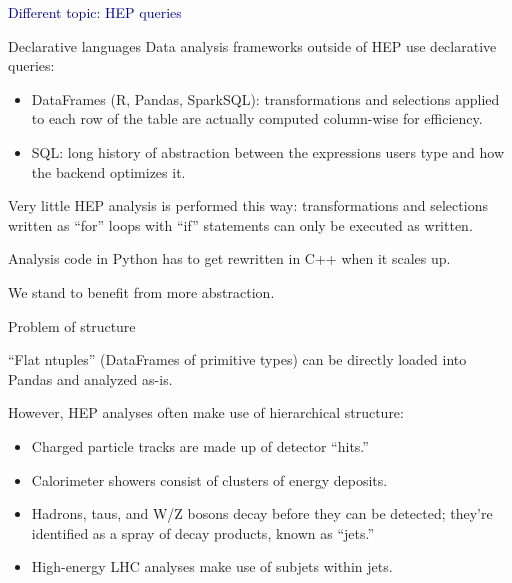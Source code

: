 \documentclass{beamer}
\begin{document}
\begin{frame}{}
\begin{center}
\Huge \textcolor{darkblue}{Different topic: HEP queries}
\end{center}
\end{frame}

\begin{frame}{Declarative languages}
\vspace{0.25 cm}
Data analysis frameworks outside of HEP use declarative queries:
\begin{itemize}
\item DataFrames (R, Pandas, SparkSQL): transformations and selections applied to each row of the table are actually computed column-wise for efficiency.
\item SQL: long history of abstraction between the expressions users type and how the backend optimizes it.
\end{itemize}

\vspace{0.5 cm}
Very little HEP analysis is performed this way: transformations and selections written as ``for'' loops with ``if'' statements can only be executed as written.

\vspace{0.25 cm}
Analysis code in Python has to get rewritten in C++ when it scales up.

\vspace{0.25 cm}
We stand to benefit from more abstraction.
\end{frame}

\begin{frame}{Problem of structure}

``Flat ntuples'' (DataFrames of primitive types) can be directly loaded into Pandas and analyzed as-is.

\vspace{0.5 cm}
However, HEP analyses often make use of hierarchical structure:
\begin{itemize}
\item Charged particle tracks are made up of detector ``hits.''
\item Calorimeter showers consist of clusters of energy deposits.
\item Hadrons, taus, and W/Z bosons decay before they can be detected; they're identified as a spray of decay products, known as ``jets.''
\item High-energy LHC analyses make use of subjets within jets.
\end{itemize}
\end{frame}
\end{document}
